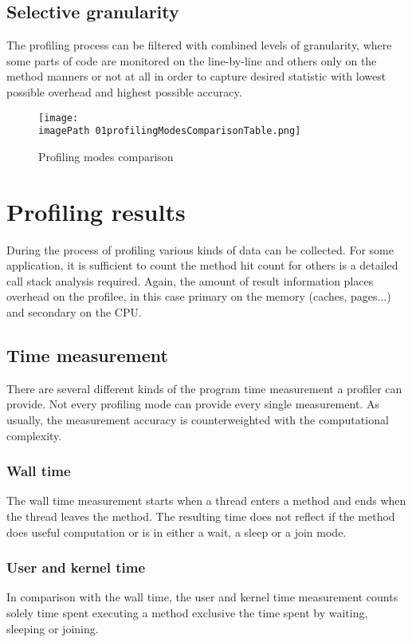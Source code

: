 \subsection{Selective granularity}
The profiling process can be filtered with combined levels of granularity, where some parts of code are monitored on the line-by-line and others only on the method manners or not at all in order to capture desired statistic with lowest possible overhead and highest possible accuracy.

\begin{figure}
	\centering
		\texttt{[image: \\imagePath 01profilingModesComparisonTable.png]}
		\caption{Profiling modes comparison}
	\label{fig:01profilingModesComparisonTable}
\end{figure}


\section{Profiling results}
During the process of profiling various kinds of data can be collected. For some application, it is sufficient to count the method hit count for others is a detailed call stack analysis required. Again, the amount of result information places overhead on the profilee, in this case primary on the memory (caches, pages...) and secondary on the CPU.

\subsection{Time measurement}
There are several different kinds of the program time measurement a profiler can provide. Not every profiling mode can provide every single measurement. As usually, the measurement accuracy is counterweighted with the computational complexity.

\subsubsection*{Wall time}
The wall time measurement starts when a thread enters a method and ends when the thread leaves the method. The resulting time does not reflect if the method does useful computation or is in either a wait, a sleep or a join mode.

\subsubsection*{User and kernel time}
In comparison with the wall time, the user and kernel time measurement counts solely time spent executing a method exclusive the time spent by waiting, sleeping or joining.

